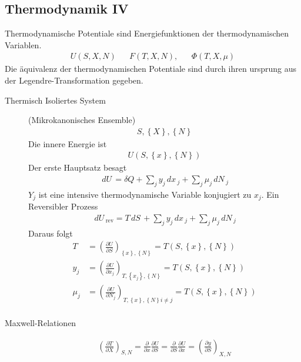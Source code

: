 \documentclass[11pt]{article}
\theoremstyle{plain}
\theoremstyle{mytheoremstyle}
\newcommand{\pd}[2]{\frac{\partial #1 }{\partial #2}}
\renewcommand{\d}[1]{\,d#1\,}
\begin{document}
\subsection*{Thermodynamik IV}
Thermodynamische Potentiale sind Energiefunktionen der thermodynamischen
Variablen.
%
\begin{align*}
  U(S,X,N) && F(T, X, N), && \Phi(T,X, \mu)
\end{align*}
%
Die äquivalenz der thermodynamischen Potentiale sind durch ihren ursprung
aus der Legendre-Transformation gegeben.
\begin{description}
  \item[Thermisch Isoliertes System] (Mikrokanonisches Ensemble)
    \begin{align*}
      S, \left\{ X \right\}, \left\{ N \right\}
    \end{align*}
    Die innere Energie ist %
    \begin{align*}
      U(S, \left\{ x \right\}, \left\{ N \right\})
    \end{align*}
    Der erste Hauptsatz besagt
    \begin{align*}
      \d{U} = \delta Q + \sum_{j}^{} y_j \d{x}_j + \sum_{j}^{} \mu_j \d{ N}_j 
    \end{align*}
    $Y_j$ ist eine intensive thermodynamische Variable konjugiert zu $x_j$.
    Ein Reversibler Prozess
    \begin{align*}
      \d{U}_{\text{rev}} = T \d{S} + \sum_{j}^{} y_j \d{x}_j + 
      \sum_{j}^{} \mu_j \d{N}_j
    \end{align*}
    Daraus folgt
    \begin{align*}
      T & = \left( \pd{U}{S} \right)_{ \left\{ x \right\}, \left\{ N \right\} }
      = T \left( S, \left\{ x \right\}, \left\{ N \right\} \right) \\
      y_j & = \left( \pd{U}{x_j} \right)_{ T, \left\{ x_j \right\}, \left\{ N \right\} }
      = T \left( S, \left\{ x \right\}, \left\{ N \right\} \right) \\
      \mu_j & = \left( \pd{U}{N_j} \right)_{ T, \left\{ x \right\}, \left\{ N \right\} i \neq j }
      = T \left( S, \left\{ x \right\}, \left\{ N \right\} \right) \\
    \end{align*}
  \item[Maxwell-Relationen] 
    \begin{align*}
      \left( \pd{T}{X} \right)_{S, N} = \pd{}{x} \pd{U}{S} = 
      \pd{}{S} \pd{U}{x} = \left( \pd{y}{S} \right)_{X, N}

\end{align*}
\end{description}
\end{document}
